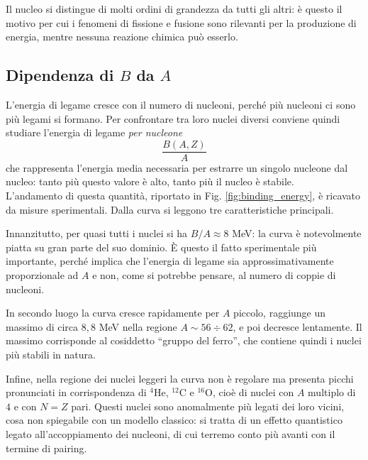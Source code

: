 Il nucleo si distingue di molti ordini di grandezza da tutti gli altri: è questo il motivo per cui i fenomeni di fissione e fusione sono rilevanti per la produzione di energia, mentre nessuna reazione chimica può esserlo. 

\subsection{Dipendenza di \texorpdfstring{$B$}{B} da \texorpdfstring{$A$}{A}}

L'energia di legame cresce con il numero di nucleoni, perché più nucleoni ci sono più legami si formano. Per confrontare tra loro nuclei diversi conviene quindi studiare l'energia di legame \emph{per nucleone}
%
\begin{equation}
    \frac{B(A,Z)}{A}
\end{equation}
che rappresenta l'energia media necessaria per estrarre un singolo nucleone dal nucleo: tanto più questo valore è alto, tanto più il nucleo è stabile.\\

L'andamento di questa quantità, riportato in Fig. \ref{fig:binding_energy}, è ricavato da misure sperimentali. Dalla curva si leggono tre caratteristiche principali. 

Innanzitutto, per quasi tutti i nuclei si ha $B/A \approx 8$ MeV: la curva è notevolmente piatta su gran parte del suo dominio. È questo il fatto sperimentale più importante, perché implica che l'energia di legame sia approssimativamente proporzionale ad $A$ e non, come si potrebbe pensare, al numero di coppie di nucleoni. 

In secondo luogo la curva cresce rapidamente per $A$ piccolo, raggiunge un massimo di circa $8,8$ MeV nella regione $A \sim 56 \div 62$, e poi decresce lentamente. Il massimo corrisponde al cosiddetto ``gruppo del ferro'', che contiene quindi i nuclei più stabili in natura. 

Infine, nella regione dei nuclei leggeri la curva non è regolare ma presenta picchi pronunciati in corrispondenza di ${}^{4}\mathrm{He}$, ${}^{12}\mathrm{C}$ e ${}^{16}\mathrm{O}$, cioè di nuclei con $A$ multiplo di $4$ e con $N = Z$ pari. Questi nuclei sono anomalmente più legati dei loro vicini, cosa non spiegabile con un modello classico: si tratta di un effetto quantistico legato all'accoppiamento dei nucleoni, di cui terremo conto più avanti con il termine di pairing. 


